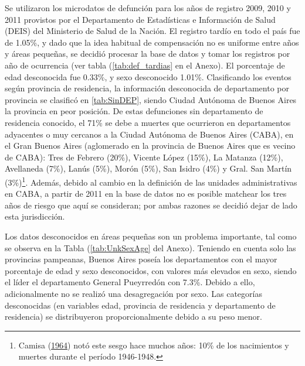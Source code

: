 \documentclass[12pt,]{article}
\begin{document}
Se utilizaron los microdatos de defunción para los años de registro
2009, 2010 y 2011 provistos por el Departamento de Estadísticas e
Información de Salud (DEIS) del Ministerio de Salud de la Nación. El
registro tardío en todo el país fue de 1.05\%, y dado que la idea
habitual de compensación no es uniforme entre años y áreas pequeñas, se
decidió procesar la base de datos y tomar los registros por año de
ocurrencia (ver tabla (\ref{tab:def_tardias} en el Anexo). El porcentaje
de edad desconocida fue 0.33\%, y sexo desconocido 1.01\%. Clasificando
los eventos según provincia de residencia, la información desconocida de
departamento por provincia se clasificó en \ref{tab:SinDEP}, siendo
Ciudad Autónoma de Buenos Aires la provincia en peor posición. De estas
defunciones sin departamento de residencia conocido, el 71\% se debe a
muertes que ocurrieron en departamentos adyacentes o muy cercanos a la
Ciudad Autónoma de Buenos Aires (CABA), en el Gran Buenos Aires
(aglomerado en la provincia de Buenos Aires que es vecino de CABA): Tres
de Febrero (20\%), Vicente López (15\%), La Matanza (12\%), Avellaneda
(7\%), Lanús (5\%), Morón (5\%), San Isidro (4\%) y Gral. San Martín
(3\%)\footnote{Camisa (\protect\hyperlink{ref-Camisa1964}{1964}) notó
  este sesgo hace muchos años: 10\% de los nacimientos y muertes durante
  el período 1946-1948.}. Además, debido al cambio en la definición de
las unidades administrativas en CABA, a partir de 2011 en la base de
datos no es posible matchear los tres años de riesgo que aquí se
consideran; por ambas razones se decidió dejar de lado esta
jurisdicción.

Los datos desconocidos en áreas pequeñas son un problema importante, tal
como se observa en la Tabla (\ref{tab:UnkSexAge} del Anexo). Teniendo en
cuenta solo las provincias pampeanas, Buenos Aires poseía los
departamentos con el mayor porcentaje de edad y sexo desconocidos, con
valores más elevados en sexo, siendo el líder el departamento General
Pueyrredón con 7.3\%. Debido a ello, adicionalmente no se realizó una
desagregación por sexo. Las categorías desconocidas (en variables edad,
provincia de residencia y departamento de residencia) se distribuyeron
proporcionalmente debido a su peso menor.
\end{document}
